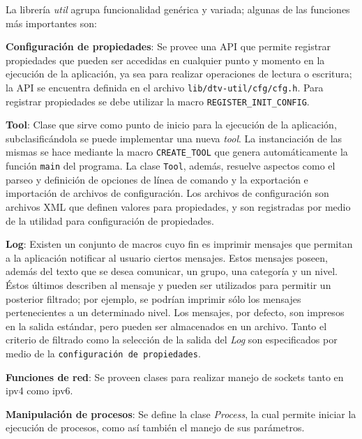 
\label{chap:util}

La librería \emph{util} agrupa funcionalidad genérica y variada; algunas de las funciones más importantes son:

\textbf{Configuración de propiedades}: Se provee una API que permite registrar propiedades que pueden ser accedidas en cualquier punto y momento en la ejecución de la aplicación, ya sea para realizar operaciones de lectura o escritura; la API se encuentra definida en el archivo \texttt{lib/dtv-util/cfg/cfg.h}. Para registrar propiedades se debe utilizar la macro \texttt{REGISTER\_INIT\_CONFIG}.

\textbf{Tool}: Clase que sirve como punto de inicio para la ejecución de la aplicación, subclasificándola se puede implementar una nueva \emph{tool}. La instanciación de las mismas se hace mediante la macro \texttt{CREATE\_TOOL} que genera automáticamente la función \texttt{main} del programa. La clase \texttt{Tool}, además, resuelve aspectos como el parseo y definición de opciones de línea de comando y la exportación e importación de archivos de configuración.
Los archivos de configuración son archivos XML que definen valores para propiedades, y son registradas por medio de la utilidad para configuración de propiedades.

\textbf{Log}: Existen un conjunto de macros cuyo fin es imprimir mensajes que permitan a la aplicación notificar al usuario ciertos mensajes. Estos mensajes poseen, además del texto que se desea comunicar, un grupo, una categoría y un nivel. Éstos últimos describen al mensaje y pueden ser utilizados para permitir un posterior filtrado; por ejemplo, se podrían imprimir sólo los mensajes pertenecientes a un determinado nivel. Los mensajes, por defecto, son impresos en la salida estándar, pero pueden ser almacenados en un archivo. Tanto el criterio de filtrado como la selección de la salida del \emph{Log} son especificados por medio de la \texttt{configuración de propiedades}.

\textbf{Funciones de red}: Se proveen clases para realizar manejo de sockets tanto en ipv4 como ipv6.

\textbf{Manipulación de procesos}: Se define la clase \emph{Process}, la cual permite iniciar la ejecución de procesos, como así también el manejo de sus parámetros.

